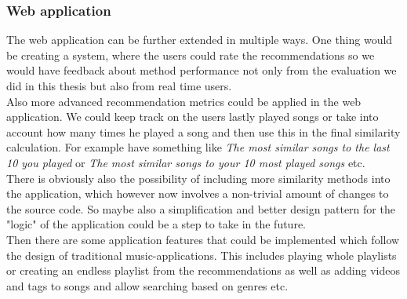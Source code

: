 \subsubsection{Web application}
The web application can be further extended in multiple ways. One thing would be creating a system, where the users could rate the recommendations so we would have feedback about method performance not only from the evaluation we did in this thesis but also from real time users. \\
Also more advanced recommendation metrics could be applied in the web application. We could keep track on the users lastly played songs or take into account how many times he played a song and then use this in the final similarity calculation. For example have something like \textit{The most similar songs to the last 10 you played} or \textit{The most similar songs to your 10 most played songs} etc. \\
There is obviously also the possibility of including more similarity methods into the application, which however now involves a non-trivial amount of changes to the source code. So maybe also a simplification and better design pattern for the "logic" of the application could be a step to take in the future. \\
Then there are some application features that could be implemented which follow the design of traditional music-applications. This includes playing whole playlists or creating an endless playlist from the recommendations as well as adding videos and tags to songs and allow searching based on genres etc. \\

